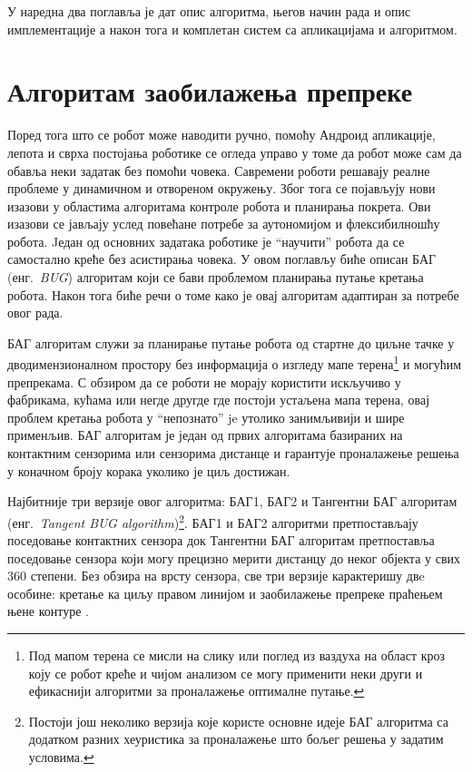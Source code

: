\documentclass[12pt,oneside]{memoir}
\theoremstyle{remark}
\begin{document}
У наредна два поглавља је дат опис алгоритма, његов начин рада и опис имплементације а након тога и комплетан систем са апликацијама и алгоритмом.

\chapter{Алгоритам заобилажења препреке}
\label{chp:algoritam}
Поред тога што се робот може наводити ручно, помоћу Андроид апликације, лепота и сврха постојања роботике се огледа управо у томе да робот може сам да обавља неки задатак без помоћи човека. Савремени роботи решавају реалне проблеме у динамичном и отвореном окружењу. Због тога се појављују нови изазови у областима алгоритама контроле робота и планирања покрета. Ови изазови се јављају услед повећане потребе за аутономијом и флексибилношћу робота. Jедан од основних задатака роботике је ``научити'' робота да се самостално креће без асистирања човека. У овом поглављу биће описан БАГ (енг.~{\em BUG}) алгоритам који се бави проблемом планирања путање кретања робота. Након тога биће речи о томе како је овај алгоритам адаптиран за потребе овог рада.

БАГ алгоритам служи за планирање путање робота од стартне до циљне тачке у дводимензионалном простору без информација о изгледу мапе терена\footnote{Под мапом терена се мисли на слику или поглед из ваздуха на област кроз коју се робот креће и чијом анализом се могу применити неки други и ефикаснији алгоритми за проналажење оптималне путање.} и могућим препрекама. С обзиром да се роботи не морају користити искључиво у фабрикама, кућама или негде другде где постоји устаљена мапа терена, овај проблем кретања робота у ``непознато'' je утолико занимљивији и шире применљив. БАГ алгоритам је један од првих алгоритама  базираних на контактним сензорима или сензорима дистанце и гарантује проналажење решења у коначном броју корака уколико је циљ достижан. 

Најбитније три верзије овог алгоритма: БАГ1, БАГ2 и Тангентни БАГ алгоритам (енг.~{\em Tangent BUG algorithm})\footnote{Постоји још неколико верзија које користе основне идеје БАГ алгоритма са додатком разних хеуристика за проналажење што бољег решења у задатим условима.}. БАГ1 и БАГ2 алгоритми претпостављају поседовање контактних сензора док Тангентни БАГ алгоритам претпоставља поседовање сензора који могу прецизно мерити дистанцу до неког објекта у свих 360 степени. Без обзира на врсту сензора, све три верзије карактеришу двe особине: кретање ка циљу правом линијом и заобилажење препреке праћењем њене контуре \cite{principlesofrobotmotion}. 
\end{document}
